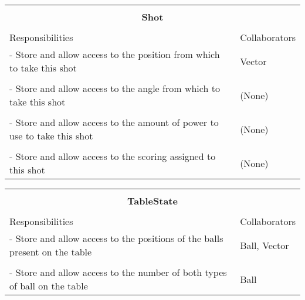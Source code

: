 \documentclass[titlepage]{article}
\begin{document}
\begin{table}[!htbp]
\centering
\begin{tabular}{| p{} | p{} |}\hline
	\multicolumn{2}{|l|}{}\\
	\multicolumn{2}{|c|}{\large{\textbf{Shot}}}\\
	\multicolumn{2}{|l|}{}\\\hline
	\vspace{0mm}\large{Responsibilities}\vspace{2mm} &\vspace{0mm}\large{Collaborators}\vspace{2mm}\\\hline
	\vspace{0mm}- Store and allow access to the position from which to take this shot	&\vspace{0mm}Vector\\&\\
	- Store and allow access to the angle from which to take this shot					&(None)\\&\\
	- Store and allow access to the amount of power to use to take this shot			&(None)\\&\\
	- Store and allow access to the scoring assigned to this shot\vspace{2mm}			&(None)\vspace{2mm}\\\hline
\end{tabular}
\end{table}

\begin{table}[!htbp]
\centering
\begin{tabular}{| p{} | p{} |}\hline
	\multicolumn{2}{|l|}{}\\
	\multicolumn{2}{|c|}{\large{\textbf{TableState}}}\\
	\multicolumn{2}{|l|}{}\\\hline
	\vspace{0mm}\large{Responsibilities}\vspace{2mm} &\vspace{0mm}\large{Collaborators}\vspace{2mm}\\\hline
	\vspace{0mm}- Store and allow access to the positions of the balls present on the table		&\vspace{0mm}Ball, Vector\\&\\
	- Store and allow access to the number of both types of ball on the table\vspace{2mm}		&Ball\vspace{2mm}\\\hline
\end{tabular}
\end{table}
\end{document}
